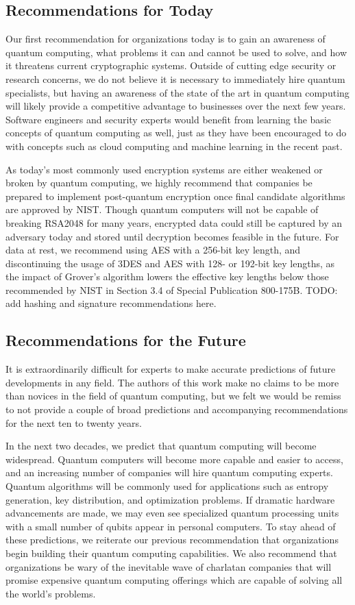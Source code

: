 \documentclass[sigconf]{acmart}
\begin{document}
\subsection{Recommendations for Today}
Our first recommendation for organizations today is to gain an awareness of quantum computing, what problems it can and cannot be used to solve, and how it threatens current cryptographic systems. Outside of cutting edge security or research concerns, we do not believe it is necessary to immediately hire quantum specialists, but having an awareness of the state of the art in quantum computing will likely provide a competitive advantage to businesses over the next few years. Software engineers and security experts would benefit from learning the basic concepts of quantum computing as well, just as they have been encouraged to do with concepts such as cloud computing and machine learning in the recent past.

As today's most commonly used encryption systems are either weakened or broken by quantum computing, we highly recommend that companies be prepared to implement post-quantum encryption once final candidate algorithms are approved by NIST. Though quantum computers will not be capable of breaking RSA2048 for many years, encrypted data could still be captured by an adversary today and stored until decryption becomes feasible in the future. For data at rest, we recommend using AES with a 256-bit key length, and discontinuing the usage of 3DES and AES with 128- or 192-bit key lengths, as the impact of Grover's algorithm lowers the effective key lengths below those recommended by NIST in Section 3.4 of Special Publication 800-175B\cite{barker_guideline_2020}. TODO: add hashing and signature recommendations here.

\subsection{Recommendations for the Future}
It is extraordinarily difficult for experts to make accurate predictions of future developments in any field. The authors of this work make no claims to be more than novices in the field of quantum computing, but we felt we would be remiss to not provide a couple of broad predictions and accompanying recommendations for the next ten to twenty years.

In the next two decades, we predict that quantum computing will become widespread. Quantum computers will become more capable and easier to access, and an increasing number of companies will hire quantum computing experts. Quantum algorithms will be commonly used for applications such as entropy generation, key distribution, and optimization problems. If dramatic hardware advancements are made, we may even see specialized quantum processing units with a small number of qubits appear in personal computers. To stay ahead of these predictions, we reiterate our previous recommendation that organizations begin building their quantum computing capabilities. We also recommend that organizations be wary of the inevitable wave of charlatan companies that will promise expensive quantum computing offerings which are capable of solving all the world's problems.
\end{document}
